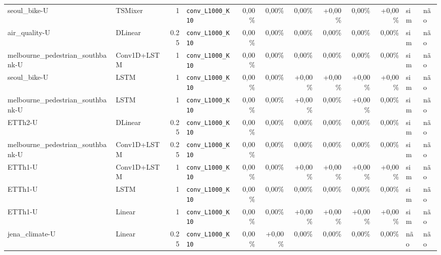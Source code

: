 \begin{longtable}{llrlrrrrrrll}
seoul\_bike-U & TSMixer & 1 & \texttt{conv\_\allowbreak{}L1000\_\allowbreak{}K10} & \textminus{}0,00\% & \textminus{}0,00\% & \textminus{}0,00\% & +0,00\% & \textminus{}0,00\% & +0,00\% & sim & n\~ao \\
air\_quality-U & DLinear & 0.25 & \texttt{conv\_\allowbreak{}L1000\_\allowbreak{}K10} & \textminus{}0,00\% & \textminus{}0,00\% & \textminus{}0,00\% & \textminus{}0,00\% & \textminus{}0,00\% & \textminus{}0,00\% & sim & n\~ao \\
melbourne\_pedestrian\_southbank-U & Conv1D+LSTM & 1 & \texttt{conv\_\allowbreak{}L1000\_\allowbreak{}K10} & \textminus{}0,00\% & \textminus{}0,00\% & \textminus{}0,00\% & \textminus{}0,00\% & \textminus{}0,00\% & \textminus{}0,00\% & sim & n\~ao \\
seoul\_bike-U & LSTM & 1 & \texttt{conv\_\allowbreak{}L1000\_\allowbreak{}K10} & \textminus{}0,00\% & \textminus{}0,00\% & +0,00\% & +0,00\% & +0,00\% & +0,00\% & sim & n\~ao \\
melbourne\_pedestrian\_southbank-U & LSTM & 1 & \texttt{conv\_\allowbreak{}L1000\_\allowbreak{}K10} & \textminus{}0,00\% & \textminus{}0,00\% & +0,00\% & \textminus{}0,00\% & +0,00\% & \textminus{}0,00\% & sim & n\~ao \\
ETTh2-U & DLinear & 0.25 & \texttt{conv\_\allowbreak{}L1000\_\allowbreak{}K10} & \textminus{}0,00\% & \textminus{}0,00\% & \textminus{}0,00\% & \textminus{}0,00\% & \textminus{}0,00\% & \textminus{}0,00\% & sim & n\~ao \\
melbourne\_pedestrian\_southbank-U & Conv1D+LSTM & 0.25 & \texttt{conv\_\allowbreak{}L1000\_\allowbreak{}K10} & \textminus{}0,00\% & \textminus{}0,00\% & \textminus{}0,00\% & \textminus{}0,00\% & \textminus{}0,00\% & \textminus{}0,00\% & sim & n\~ao \\
ETTh1-U & Conv1D+LSTM & 1 & \texttt{conv\_\allowbreak{}L1000\_\allowbreak{}K10} & \textminus{}0,00\% & \textminus{}0,00\% & +0,00\% & +0,00\% & +0,00\% & +0,00\% & sim & n\~ao \\
ETTh1-U & LSTM & 1 & \texttt{conv\_\allowbreak{}L1000\_\allowbreak{}K10} & \textminus{}0,00\% & \textminus{}0,00\% & \textminus{}0,00\% & \textminus{}0,00\% & \textminus{}0,00\% & \textminus{}0,00\% & sim & n\~ao \\
ETTh1-U & Linear & 1 & \texttt{conv\_\allowbreak{}L1000\_\allowbreak{}K10} & \textminus{}0,00\% & \textminus{}0,00\% & +0,00\% & +0,00\% & +0,00\% & +0,00\% & sim & n\~ao \\
jena\_climate-U & Linear & 0.25 & \texttt{conv\_\allowbreak{}L1000\_\allowbreak{}K10} & \textminus{}0,00\% & +0,00\% & \textminus{}0,00\% & \textminus{}0,00\% & \textminus{}0,00\% & \textminus{}0,00\% & n\~ao & n\~ao \\

\end{longtable}
